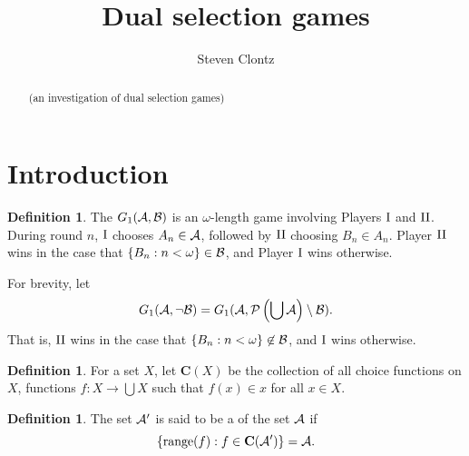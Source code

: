 \documentclass{amsart}
\theoremstyle{plain}
\theoremstyle{definition}
\newtheorem{definition}[theorem]{Definition}
\theoremstyle{remark}
\theoremstyle{plain}
\theoremstyle{definition}
\theoremstyle{remark}
\begin{document}
\title{Dual selection games}



\author{Steven Clontz}
\address{Department of Mathematics and Statistics,
The University of South Alabama,
Mobile, AL 36688}










\begin{abstract}
  (an investigation of dual selection games)
\end{abstract}


\maketitle







\section{Introduction}

\begin{definition}
  The  \(G_{1}(\mathcal{A},\mathcal{B})\) 
  is an \(\omega\)-length game involving Players \(\mathrm{I}\) and \(\mathrm{II}\). 
  During round \(n\), \(\mathrm{I}\) chooses
  \(A_n\in\mathcal{A}\), followed by \(\mathrm{II}\) choosing \(B_n\in A_n\).
  Player \(\mathrm{II}\) wins in the case that \(\{B_n:n<\omega\}\in\mathcal{B}\),
  and Player \(\mathrm{I}\) wins otherwise.
\end{definition}

  For brevity, let 
  \[
    G_{1}(\mathcal{A},\neg \mathcal{B})
      =
    G_{1}(\mathcal{A},\mathcal{P}\left(\bigcup \mathcal{A}\right)\setminus \mathcal{B})
  .\]
  That is, \(\mathrm{II}\) wins in the case that \(\{B_n:n<\omega\}\not\in\mathcal{B}\),
  and \(\mathrm{I}\) wins otherwise.

\begin{definition}
  For a set \(X\), let \(\mathbf C(X)\) be the collection of all
  choice functions on \(X\), functions \(f:X\to\bigcup X\) 
  such that \(f(x)\in x\) for all \(x\in X\).
\end{definition}

\begin{definition}
  The set \(\mathcal{A}'\) is said to be a  of the set \(\mathcal{A}\)
  if \[\{\text{range}(f):f\in\mathbf C(\mathcal{A}')\}=\mathcal{A}.\]
\end{definition}
\end{document}
